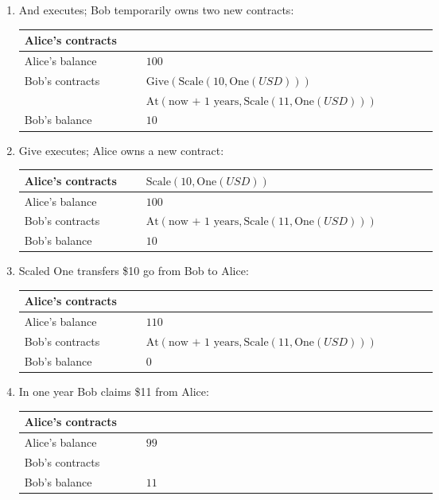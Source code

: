 \begin{enumerate}
	
	\item \(\mathrm{And}\) executes; Bob temporarily owns two new contracts:
	
	\begin{tabular}{| p{0.25\linewidth} | p{0.60\linewidth} |}
		\hline
		Alice's contracts & \\
		\hline
		Alice's balance & $100$ \\
		\hline
		\multirow{2}{10em}{Bob's contracts} & \(\mathrm{Give}(\mathrm{Scale}(10,\mathrm{One}(USD)))\)\\
		& \(\mathrm{At}(\text{now + 1 years},\mathrm{Scale}(11,\mathrm{One}(USD)))\)\\
		\hline
		Bob's balance & $10$ \\
		\hline    
	\end{tabular}
	
	\item \(\mathrm{Give}\) executes; Alice owns a new contract:
	
	\begin{tabular}{| p{0.25\linewidth} | p{0.60\linewidth} |}
		\hline
		Alice's contracts & \(\mathrm{Scale}(10,\mathrm{One}(USD))\) \\
		\hline
		Alice's balance & $100$ \\
		\hline
		Bob's contracts & \(\mathrm{At}(\text{now + 1 years},\mathrm{Scale}(11,\mathrm{One}(USD)))\) \\
		\hline
		Bob's balance & $10$ \\
		\hline    
	\end{tabular}
	
	\item Scaled \(\mathrm{One}\) transfers \$10 go from Bob to Alice:
	
	\begin{tabular}{| p{0.25\linewidth} | p{0.60\linewidth} |}
		\hline
		Alice's contracts & \\
		\hline
		Alice's balance & $110$ \\
		\hline
		Bob's contracts & \(\mathrm{At}(\text{now + 1 years},\mathrm{Scale}(11,\mathrm{One}(USD)))\) \\
		\hline
		Bob's balance & $0$ \\
		\hline    
	\end{tabular}
	
	\item In one year Bob claims \$11 from Alice:
	
	\begin{tabular}{| p{0.25\linewidth} | p{0.60\linewidth} |}
		\hline
		Alice's contracts & \\
		\hline
		Alice's balance & $99$ \\
		\hline
		Bob's contracts & \\
		\hline
		Bob's balance & $11$ \\
		\hline    
	\end{tabular}
	
\end{enumerate}


